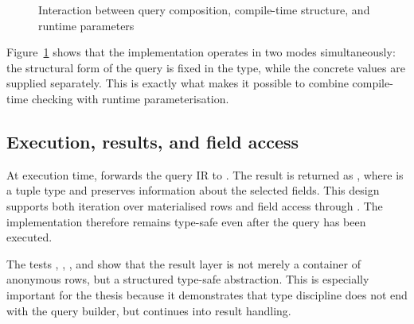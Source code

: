 \begin{figure}[H]
\centering
{}
\caption{Interaction between query composition, compile-time structure, and runtime parameters}
\label{fig:query_composition_execution}
\end{figure}

Figure~\ref{fig:query_composition_execution} shows that the implementation operates in two modes simultaneously: the structural form of the query is fixed in the type, while the concrete values are supplied separately. This is exactly what makes it possible to combine compile-time checking with runtime parameterisation.

\subsection{Execution, results, and field access}

At execution time,  forwards the query IR to . The result is returned as , where  is a tuple type and  preserves information about the selected fields. This design supports both iteration over materialised rows and field access through . The implementation therefore remains type-safe even after the query has been executed.

The tests , , , and  show that the result layer is not merely a container of anonymous rows, but a structured type-safe abstraction. This is especially important for the thesis because it demonstrates that type discipline does not end with the query builder, but continues into result handling.

